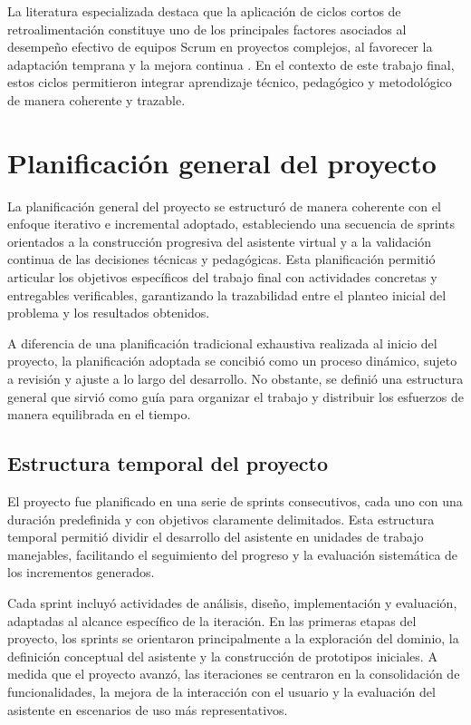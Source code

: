 La literatura especializada destaca que la aplicación de ciclos cortos de retroalimentación constituye uno de los principales factores asociados al desempeño efectivo de equipos Scrum en proyectos complejos, al favorecer la adaptación temprana y la mejora continua \parencite{verwijs2023scrum, rath2025agile}. En el contexto de este trabajo final, estos ciclos permitieron integrar aprendizaje técnico, pedagógico y metodológico de manera coherente y trazable.

\section{Planificación general del proyecto}

La planificación general del proyecto se estructuró de manera coherente con el enfoque iterativo e incremental adoptado, estableciendo una secuencia de sprints orientados a la construcción progresiva del asistente virtual y a la validación continua de las decisiones técnicas y pedagógicas. Esta planificación permitió articular los objetivos específicos del trabajo final con actividades concretas y entregables verificables, garantizando la trazabilidad entre el planteo inicial del problema y los resultados obtenidos.

A diferencia de una planificación tradicional exhaustiva realizada al inicio del proyecto, la planificación adoptada se concibió como un proceso dinámico, sujeto a revisión y ajuste a lo largo del desarrollo. No obstante, se definió una estructura general que sirvió como guía para organizar el trabajo y distribuir los esfuerzos de manera equilibrada en el tiempo.

\subsection{Estructura temporal del proyecto}

El proyecto fue planificado en una serie de sprints consecutivos, cada uno con una duración predefinida y con objetivos claramente delimitados. Esta estructura temporal permitió dividir el desarrollo del asistente en unidades de trabajo manejables, facilitando el seguimiento del progreso y la evaluación sistemática de los incrementos generados.

Cada sprint incluyó actividades de análisis, diseño, implementación y evaluación, adaptadas al alcance específico de la iteración. En las primeras etapas del proyecto, los sprints se orientaron principalmente a la exploración del dominio, la definición conceptual del asistente y la construcción de prototipos iniciales. A medida que el proyecto avanzó, las iteraciones se centraron en la consolidación de funcionalidades, la mejora de la interacción con el usuario y la evaluación del asistente en escenarios de uso más representativos.

